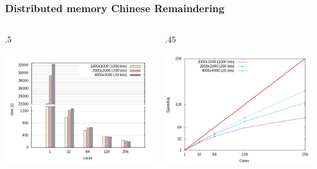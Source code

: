 \documentclass{beamer}
\begin{document}
\begin{frame}
  \frametitle{Distributed memory Chinese Remaindering}

      \begin{columns}
      \begin{column} {.5\textwidth}
        \begin{center}
          \includegraphics[width=\textwidth]{nodes_histogram}
      \end{center}
      \end{column}
      \begin{column} {.45\textwidth}
        \begin{center}
          \includegraphics[width=\textwidth]{nodes_SPEEDUP}

\end{center}
\end{column}
\end{columns}
\end{frame}
\end{document}
